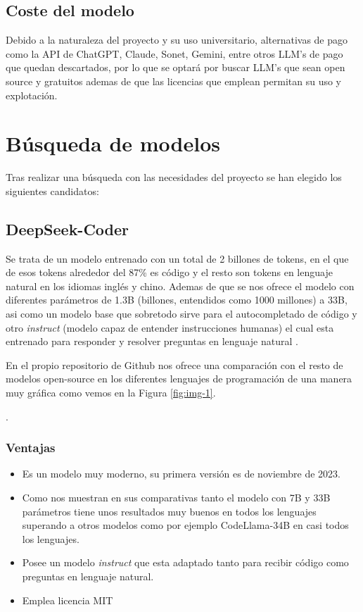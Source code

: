 \subsection{Coste del modelo}
Debido a la naturaleza del proyecto y su uso universitario, alternativas de pago como la API de ChatGPT, Claude, Sonet, Gemini, entre otros LLM's de pago que quedan descartados, por lo que se optará por buscar LLM's que sean open source y gratuitos ademas de que las licencias que emplean permitan su uso y explotación.

\section{Búsqueda de modelos}

Tras realizar una búsqueda con las necesidades del proyecto se han elegido los siguientes candidatos:

\subsection{DeepSeek-Coder}
Se trata de un modelo entrenado con un total de 2 billones de tokens, en el que de esos tokens alrededor del 87\% es código y el resto son tokens en lenguaje natural en los idiomas inglés y chino. Ademas de que se nos ofrece el modelo con diferentes parámetros  de 1.3B (billones, entendidos como 1000 millones) a 33B, asi como un modelo base que sobretodo sirve para el autocompletado de código y otro \textit{instruct} (modelo capaz de entender instrucciones humanas) el cual esta entrenado para responder y resolver preguntas en lenguaje natural \cite{DeepSeek-coder}.

En el propio repositorio de Github nos ofrece una comparación con el resto de modelos open-source en los diferentes lenguajes de programación de una manera muy gráfica como vemos en la Figura \ref{fig:img-1}.

.

\subsubsection{Ventajas}
\begin{itemize}
	\item Es un modelo muy moderno, su primera versión es de noviembre de 2023.
	\item Como nos muestran en sus comparativas tanto el modelo con 7B y 33B parámetros tiene unos resultados muy buenos en todos los lenguajes superando a otros modelos como por ejemplo CodeLlama-34B en casi todos los lenguajes.
    \item Posee un modelo \textit{instruct} que esta adaptado tanto para recibir código como preguntas en lenguaje natural.
    \item Emplea licencia MIT
\end{itemize}
